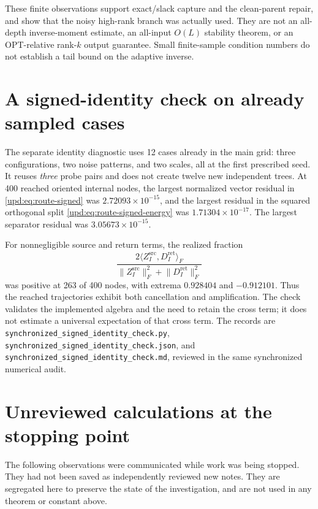 \documentclass[11pt,oneside,openany,a4paper]{book}
\numberwithin{equation}{chapter}
\theoremstyle{definition}
\theoremstyle{remark}
\newcommand{\sourcefile}[1]{{\small\nolinkurl{#1}}}
\begin{document}
These finite observations support exact/slack capture and the
clean-parent repair, and show that the noisy high-rank branch was
actually used.  They are not an all-depth inverse-moment estimate, an
all-input $O(L)$ stability theorem, or an OPT-relative rank-$k$ output
guarantee.  Small finite-sample condition numbers do not establish a
tail bound on the adaptive inverse.

\section{A signed-identity check on already sampled cases}

The separate identity diagnostic uses 12 cases already in the main
grid: three configurations, two noise patterns, and two scales, all
at the first prescribed seed.  It reuses \emph{three} probe pairs and
does not create twelve new independent trees.  At 400 reached oriented
internal nodes, the largest normalized vector residual in
\eqref{upd:eq:route-signed} was $2.72093\times10^{-15}$, and the largest
residual in the squared orthogonal split
\eqref{upd:eq:route-signed-energy} was $1.71304\times10^{-17}$.
The largest separator residual was $3.05673\times10^{-15}$.

For nonnegligible source and return terms, the realized fraction
\[
 \frac{2\langle Z_I^{\mathrm{src}},D_I^{\mathrm{ret}}\rangle_F}
 {\lVert Z_I^{\mathrm{src}}\rVert_F^2+
  \lVert D_I^{\mathrm{ret}}\rVert_F^2}
\]
was positive at 263 of 400 nodes, with extrema $0.928404$ and
$-0.912101$.  Thus the reached trajectories exhibit both cancellation
and amplification.  The check validates the implemented algebra and
the need to retain the cross term; it does not estimate a universal
expectation of that cross term.  The records are
\sourcefile{synchronized_signed_identity_check.py},
\sourcefile{synchronized_signed_identity_check.json}, and
\sourcefile{synchronized_signed_identity_check.md}, reviewed in the
same synchronized numerical audit.

\section{Unreviewed calculations at the stopping point}
\label{upd:sec:route-unreviewed}

The following observations were communicated while work was being
stopped.  They had not been saved as independently reviewed new notes.
They are segregated here to preserve the state of the investigation,
and are not used in any theorem or constant above.
\end{document}

